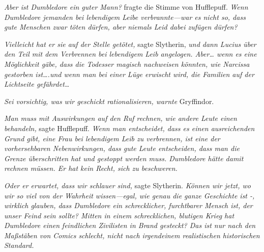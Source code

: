 \emph{Aber \emph{ist} Dumbledore ein guter Mann?} fragte die Stimme von Hufflepuff. \emph{Wenn Dumbledore jemanden bei lebendigem Leibe verbrannte—war es nicht so, dass gute Menschen zwar töten dürfen, aber niemals Leid dabei zufügen dürfen?}

\emph{Vielleicht hat er sie auf der Stelle getötet,} sagte Slytherin, \emph{und dann Lucius über den Teil mit dem Verbrennen bei lebendigem Leib angelogen. Aber… wenn es eine Möglichkeit gäbe, dass die Todesser magisch nachweisen könnten, wie Narcissa gestorben ist….und wenn man bei einer Lüge erwischt wird, die Familien auf der Lichtseite gefährdet…}

\emph{Sei vorsichtig, was wir geschickt rationalisieren, warnte} Gryffindor.

\emph{Man muss mit Auswirkungen auf den Ruf rechnen, wie andere Leute einen behandeln,} sagte Hufflepuff. \emph{Wenn man entscheidet, dass es einen ausreichenden Grund gibt, eine Frau bei lebendigem Leib zu verbrennen, ist eine der vorhersehbaren Nebenwirkungen, dass gute Leute entscheiden, dass man die Grenze überschritten hat und gestoppt werden muss. Dumbledore hätte damit rechnen müssen. Er hat kein Recht, sich zu beschweren.}

\emph{Oder er erwartet, dass wir schlauer sind,} sagte Slytherin. \emph{Können wir jetzt, wo wir so viel von der Wahrheit wissen—egal, wie genau die ganze Geschichte ist -, wirklich glauben, dass Dumbledore ein schrecklicher, furchtbarer Mensch ist, der unser Feind sein sollte? Mitten in einem schrecklichen, blutigen Krieg hat Dumbledore einen} \emph{feindlichen Zivilisten in Brand gesteckt? Das ist nur nach den Maßstäben von Comics schlecht, nicht nach irgendeinem realistischen historischen Standard.}

